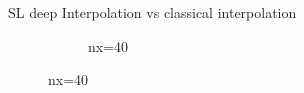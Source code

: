 \begin{frame}{SL deep Interpolation vs classical interpolation}
\begin{figure}
\begin{subfigure}{0.2\textwidth}
            \caption{nx=40}
        \end{subfigure}
    
    \end{figure}
   
    

\end{frame}